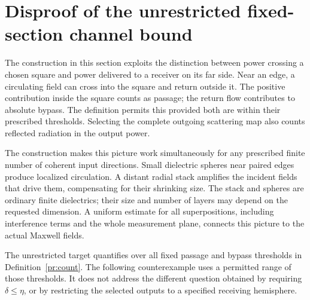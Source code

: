 \section{Disproof of the unrestricted fixed-section channel bound}
\label{uc:section}

The construction in this section exploits the distinction between power
crossing a chosen square and power delivered to a receiver on its far side.
Near an edge, a circulating field can cross into the square and return
outside it.  The positive contribution inside the square counts as passage;
the return flow contributes to absolute bypass.  The definition permits this
provided both are within their prescribed thresholds.  Selecting the complete
outgoing scattering map also counts reflected radiation in the output power.

The construction makes this picture work simultaneously for any prescribed
finite number of coherent input directions.  Small dielectric spheres near
paired edges produce localized circulation.  A distant radial stack amplifies
the incident fields that drive them, compensating for their shrinking size.
The stack and spheres are ordinary finite dielectrics; their size and number
of layers may depend on the requested dimension.  A uniform estimate for all
superpositions, including interference terms and the whole measurement plane,
connects this picture to the actual Maxwell fields.

The unrestricted target quantifies over all fixed passage and bypass
thresholds in Definition~\ref{pr:count}. The following counterexample
uses a permitted range of those thresholds. It does not address the
different question obtained by requiring $\delta\leq\eta$, or by
restricting the selected outputs to a specified receiving hemisphere.

